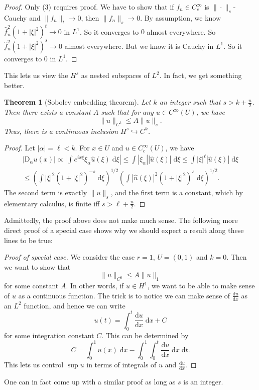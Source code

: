 \documentclass{shortart}
\newtheorem*{thm}{Theorem}
\theoremstyle{definition}
\renewcommand\d{\mathrm{d}}
\newcommand\D{\mathrm{D}}
\begin{document}
\begin{proof}
  Only (3) requires proof. We have to show that if $f_n \in C_c^\infty$ is $\|\cdot\|_s$-Cauchy and $\|f_n\|_t \to 0$, then $\|f_n\|_s \to 0$. By assumption, we know $\hat{f}_n^2(1 + |\xi|^2)^t \to 0$ in $L^1$. So it converges to $0$ almost everywhere. So $\hat{f}_n^2 (1 + |\xi|^2)^s \to 0$ almost everywhere. But we know it is Cauchy in $L^1$. So it converges to $0$ in $L^1$.
\end{proof}

This lets us view the $H^s$ as nested subspaces of $L^2$. In fact, we get something better.
\begin{thm}[Sobolev embedding theorem]
  Let $k$ an integer such that $s > k + \frac{n}{2}$. Then there exists a constant $A$ such that for any $u \in C^{\infty}(U)$, we have
  \[
    \|u\|_{C^k} \leq A \|u\|_s.
  \]
  Thus, there is a continuous inclusion $H^s \hookrightarrow C^k$.
\end{thm}
\begin{proof}
  Let $|\alpha| = \ell < k$. For $x \in U$ and $u \in C^\infty_c(U)$, we have
  \begin{multline*}
    |\D_\alpha u(x)| \propto \left| \int e^{ix\xi} \xi_\alpha \hat{u}(\xi) \;\d \xi\right| \leq \int |\xi_\alpha| |\hat{u}(\xi)| \;\d \xi \leq \int |\xi|^\ell |\hat{u}(\xi)|\;\d \xi \\
    \leq \left(\int |\xi|^2 (1 + |\xi|^2)^{-s}\;\d \xi\right)^{1/2}\left(\int |\hat{u}(\xi)|^2 (1 + |\xi|^2)^s\;\d \xi\right)^{1/2}.
  \end{multline*}
  The second term is exactly $\|u\|_s$, and the first term is a constant, which by elementary calculus, is finite iff $s > \ell + \frac{n}{2}$.
\end{proof}

Admittedly, the proof above does not make much sense. The following more direct proof of a special case shows why we should expect a result along these lines to be true:
\begin{proof}[Proof of special case]
  We consider the case $r = 1$, $U = (0, 1)$ and $k = 0$. Then we want to show that
  \[
    \|u\|_{C^0} \leq A \|u\|_1
  \]
  for some constant $A$. In other words, if $u \in H^1$, we want to be able to make sense of $u$ as a continuous function. The trick is to notice we can make sense of $\frac{\d u}{\d x}$ as an $L^2$ function, and hence we can write
  \[
    u(t) = \int_0^t \frac{\d u}{\d x}\;\d x + C
  \]
  for some integration constant $C$. This can be determined by
  \[
    C = \int_0^1 u(x)\;\d x - \int_0^1 \int_0^t \frac{\d u}{\d x}\;\d x\;\d t.
  \]
  This lets us control $\sup u$ in terms of integrals of $u$ and $\frac{\d u}{\d x}$.
\end{proof}
One can in fact come up with a similar proof as long as $s$ is an integer.
\end{document}

